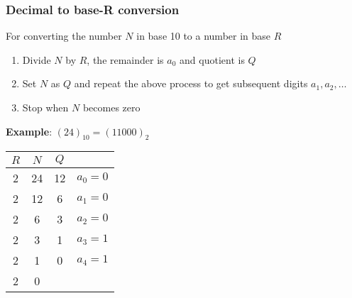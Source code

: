 \documentclass[oneside]{book}
\begin{document}
\subsubsection{Decimal to base-R conversion}
For converting the number \(N\) in base 10 to a number in base \(R\)
\begin{enumerate}
	\item Divide \(N\) by \(R\), the remainder is \(a_0\) and quotient is \(Q\)
	\item Set \(N\) as \(Q\) and repeat the above process to get subsequent digits \(a_1, a_2, \ldots\)
	\item Stop when \(N\) becomes zero
\end{enumerate}
\textbf{Example}: \((24)_{10} = (11000)_2\)
\begin{center}
	\begin{tabular}{|cccl|}
		\hline
		\(R\) & \(N\) & \(Q\) &             \\
		\hline
		2     & 24    & 12    & \(a_0 = 0\) \\
		2     & 12    & 6     & \(a_1 = 0\) \\
		2     & 6     & 3     & \(a_2 = 0\) \\
		2     & 3     & 1     & \(a_3 = 1\) \\
		2     & 1     & 0     & \(a_4 = 1\) \\
		2     & 0     &       &             \\
		\hline
	\end{tabular}
\end{center}
\end{document}
